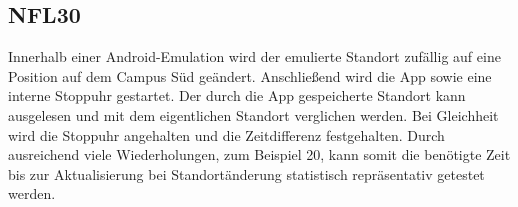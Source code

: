 \subsection*{NFL30}

Innerhalb einer Android-Emulation wird der emulierte Standort zufällig auf eine Position auf dem Campus Süd geändert.
Anschließend wird die App sowie eine interne Stoppuhr gestartet.
Der durch die App gespeicherte Standort kann ausgelesen und mit dem eigentlichen Standort verglichen werden.
Bei Gleichheit wird die Stoppuhr angehalten und die Zeitdifferenz festgehalten.
Durch ausreichend viele Wiederholungen, zum Beispiel 20, kann somit die benötigte Zeit bis zur Aktualisierung bei Standortänderung statistisch repräsentativ getestet werden.